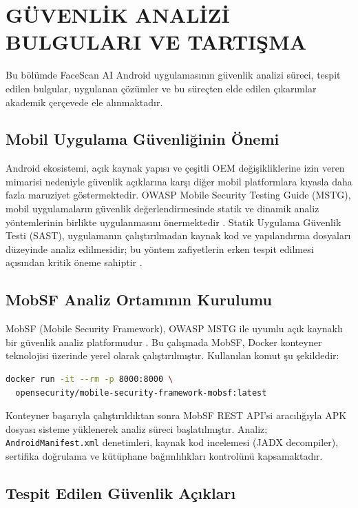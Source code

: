 \section{GÜVENLİK ANALİZİ BULGULARI VE TARTIŞMA}

Bu bölümde FaceScan AI Android uygulamasının güvenlik analizi süreci, tespit edilen bulgular, uygulanan çözümler ve bu süreçten elde edilen çıkarımlar akademik çerçevede ele alınmaktadır.

\subsection{Mobil Uygulama Güvenliğinin Önemi}

Android ekosistemi, açık kaynak yapısı ve çeşitli OEM değişikliklerine izin veren mimarisi nedeniyle güvenlik açıklarına karşı diğer mobil platformlara kıyasla daha fazla maruziyet göstermektedir. OWASP Mobile Security Testing Guide (MSTG), mobil uygulamaların güvenlik değerlendirmesinde statik ve dinamik analiz yöntemlerinin birlikte uygulanmasını önermektedir \cite{owasp2023mobile}. Statik Uygulama Güvenlik Testi (SAST), uygulamanın çalıştırılmadan kaynak kod ve yapılandırma dosyaları düzeyinde analiz edilmesidir; bu yöntem zafiyetlerin erken tespit edilmesi açısından kritik öneme sahiptir \cite{al2018mobile}.

\subsection{MobSF Analiz Ortamının Kurulumu}

MobSF (Mobile Security Framework), OWASP MSTG ile uyumlu açık kaynaklı bir güvenlik analiz platformudur \cite{mobsf2023docs}. Bu çalışmada MobSF, Docker konteyner teknolojisi üzerinde yerel olarak çalıştırılmıştır. Kullanılan komut şu şekildedir:

\begin{lstlisting}[language=bash]
docker run -it --rm -p 8000:8000 \
  opensecurity/mobile-security-framework-mobsf:latest
\end{lstlisting}

Konteyner başarıyla çalıştırıldıktan sonra MobSF REST API'si aracılığıyla APK dosyası sisteme yüklenerek analiz süreci başlatılmıştır. Analiz; \texttt{AndroidManifest.xml} denetimleri, kaynak kod incelemesi (JADX decompiler), sertifika doğrulama ve kütüphane bağımlılıkları kontrolünü kapsamaktadır.

\subsection{Tespit Edilen Güvenlik Açıkları}

